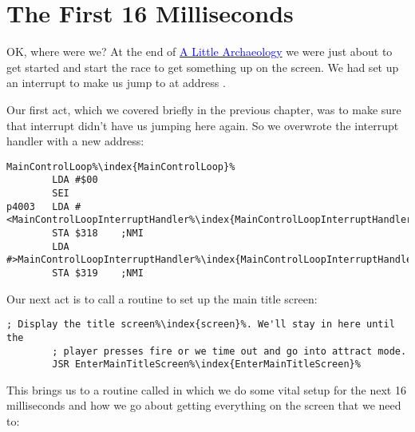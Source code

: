 \chapter{The First 16 Milliseconds} 
\label{sec:first16}
\lstset{style=6502Style}
OK, where were we? At the end of \hyperref[sec:archaeo]{\textcolor{blue}{A Little Archaeology}}
we were just about to get started and start the race to get something up on the screen.
We had set up an interrupt to make us jump to  at address .

Our first act, which we covered briefly in the previous chapter, was to make sure that interrupt didn't
have us jumping here again. So we overwrote the interrupt handler with a new address:

\begin{lstlisting}[caption=The code at \icode{\$4000}. ,escapechar=\%]
MainControlLoop%\index{MainControlLoop}%
        LDA #$00
        SEI
p4003   LDA #<MainControlLoopInterruptHandler%\index{MainControlLoopInterruptHandler}%
        STA $318    ;NMI
        LDA #>MainControlLoopInterruptHandler%\index{MainControlLoopInterruptHandler}%
        STA $319    ;NMI
\end{lstlisting}

Our next act is to call a routine to set up the main title screen:

\begin{lstlisting}[caption=In \icode{MainControlLoop\index{MainControlLoop}},escapechar=\%]
        ; Display the title screen%\index{screen}%. We'll stay in here until the
        ; player presses fire or we time out and go into attract mode.
        JSR EnterMainTitleScreen%\index{EnterMainTitleScreen}%
\end{lstlisting}

This brings us to a routine called  in
which we do some vital setup for the next 16 milliseconds and how we go about getting everything
on the screen that we need to:
\clearpage

